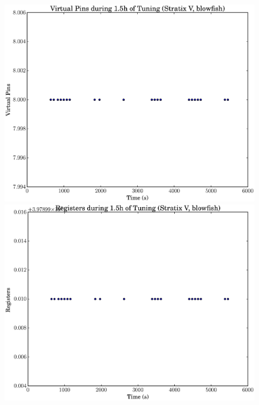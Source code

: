 \documentclass[12pt, a4paper]{article}
\begin{document}
\begin{figure}[htpb]
    \begin{minipage}{.48\textwidth}
        \includegraphics[scale=.25]{blowfish_pins_5400_chstone_StratixV}
    \end{minipage}%
    \hfill
    \begin{minipage}{.48\textwidth}
        \includegraphics[scale=.25]{blowfish_regs_5400_chstone_StratixV}
    \end{minipage}%


\end{figure}
\end{document}
